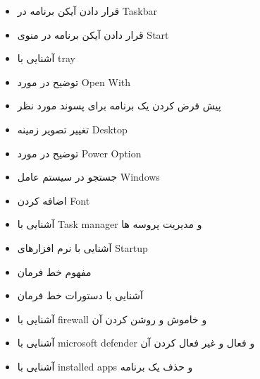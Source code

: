 \begin{itemize}
\item
قرار دادن آیکن برنامه در Taskbar
\item
قرار دادن آیکن برنامه در منوی Start
\item
آشنایی با tray
\item
توضیح در مورد Open With
\item
پیش فرض کردن یک برنامه برای پسوند مورد نظر
\item
تغییر تصویر زمینه Desktop
\item
توضیح در مورد Power Option
\item
جستجو در سیستم عامل Windows
\item
اضافه کردن Font
\item
آشنایی با Task manager و مدیریت پروسه ها
\item
آشنایی با نرم افزارهای Startup
\item
مفهوم خط فرمان
\item
آشنایی با دستورات خط فرمان
\item
آشنایی با firewall و خاموش و روشن کردن آن
\item
آشنایی با microsoft defender و فعال و غیر فعال کردن آن
\item
آشنایی با installed apps و حذف یک برنامه
\end{itemize}